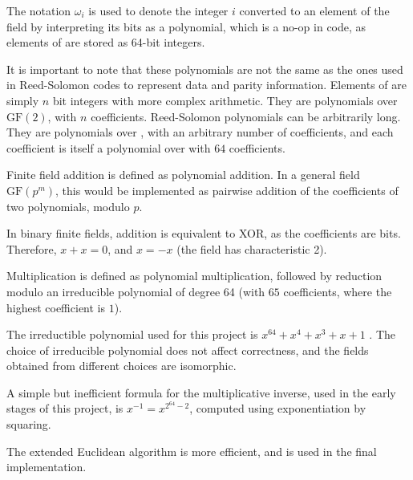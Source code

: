 The notation $\omega_i$ is used to denote the integer $i$ converted to an element of the field  by interpreting its bits as a polynomial, which is a no-op in code, as elements of  are stored as 64-bit integers.

It is important to note that these polynomials are not the same as the ones used in Reed-Solomon codes to represent data and parity information.
Elements of  are simply $n$ bit integers with more complex arithmetic. They are polynomials over $\text{GF}(2)$, with $n$ coefficients.
Reed-Solomon polynomials can be arbitrarily long. They are polynomials over , with an arbitrary number of coefficients, and each coefficient is itself a polynomial over  with $64$ coefficients.

Finite field addition is defined as polynomial addition.
In a general field $\text{GF}(p^m)$, this would be implemented as pairwise addition of the coefficients of two polynomials, modulo $p$.

In binary finite fields, addition is equivalent to XOR, as the coefficients are bits. Therefore, $x + x = 0$, and $x = -x$ (the field has characteristic 2).

Multiplication is defined as polynomial multiplication, followed by reduction modulo an irreducible polynomial of degree 64 (with $65$ coefficients, where the highest coefficient is $1$).

The irreductible polynomial used for this project is $x^{64} + x^4 + x^3 + x + 1$ \cite{low-weight-polynomials}.
The choice of irreducible polynomial does not affect correctness, and the fields obtained from different choices are isomorphic.


A simple but inefficient formula for the multiplicative inverse, used in the early stages of this project, is $x^{-1} = x^{2^{64} - 2}$, computed using exponentiation by squaring.

The extended Euclidean algorithm is more efficient, and is used in the final implementation.
